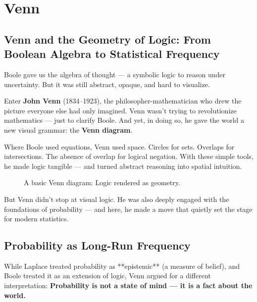 \section{Venn}

\subsection{Venn and the Geometry of Logic: From Boolean Algebra to Statistical Frequency}

Boole gave us the algebra of thought — a symbolic logic to reason under uncertainty. But it was still abstract, opaque, and hard to visualize.

Enter \textbf{John Venn} (1834–1923), the philosopher-mathematician who drew the picture everyone else had only imagined. Venn wasn’t trying to revolutionize mathematics — just to clarify Boole. And yet, in doing so, he gave the world a new visual grammar: the \textbf{Venn diagram}.

Where Boole used equations, Venn used space. Circles for sets. Overlaps for intersections. The absence of overlap for logical negation. With these simple tools, he made logic tangible — and turned abstract reasoning into spatial intuition.

\begin{figure}[H]
    \centering
    \caption{A basic Venn diagram: Logic rendered as geometry.}
\end{figure}

But Venn didn’t stop at visual logic. He was also deeply engaged with the foundations of probability — and here, he made a move that quietly set the stage for modern statistics.

\subsection{Probability as Long-Run Frequency}

While Laplace treated probability as **epistemic** (a measure of belief), and Boole treated it as an extension of logic, Venn argued for a different interpretation:  
\textbf{Probability is not a state of mind — it is a fact about the world.}

